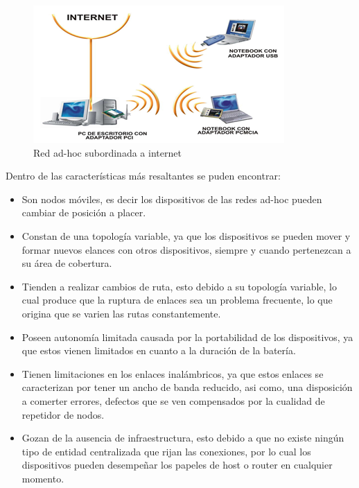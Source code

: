 \begin{figure}[hbp]
	\centering
		\includegraphics[scale=0.7]{Imagenes/adhoc}
		\caption[Red ad-hoc subordinada a internet]{Red ad-hoc subordinada a internet \protect\footnotemark}
		\label{fig:adhoc}
	\end{figure}	


\par Dentro de las características más resaltantes se puden encontrar:
\begin{itemize}
	\item Son nodos móviles, es decir los dispositivos de las redes ad-hoc pueden cambiar de posición a placer.
	\item Constan de una topología variable, ya que los dispositivos se pueden mover y formar nuevos elances con otros dispositivos, siempre y cuando pertenezcan a su área de cobertura.
	\item Tienden a realizar cambios de ruta, esto debido a su topología variable, lo cual produce que la ruptura de enlaces sea un problema frecuente, lo que origina que se varien las rutas constantemente.
	\item Poseen autonomía limitada causada por la portabilidad de los dispositivos, ya que estos vienen limitados en cuanto a la duración de la batería.
	\item Tienen limitaciones en los enlaces inalámbricos, ya que estos enlaces se caracterizan por tener un ancho de banda reducido, asi como, una disposición a comerter errores, defectos que se ven compensados por la cualidad de repetidor de nodos. 
	\item Gozan de la ausencia de infraestructura, esto debido a que no existe ningún tipo de entidad centralizada que rijan las conexiones, por lo cual los dispositivos pueden desempeñar los papeles de host o router en cualquier momento.
\end{itemize}

